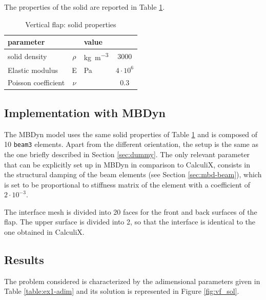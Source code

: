 The properties of the solid are reported in Table \ref{table:ex1-solid}.

\begin{table}[!htb]
	\begin{center}
		\begin{tabular}{ l c  l | c } 
			parameter & & value &    \\ 
			\hline
			solid density  & $\rho$ & \si{kg.m^{-3}} & 3000    \\
			Elastic modulus  & E & \si{Pa} & $4\cdot 10^6$    \\
			Poisson coefficient & $\nu$ & & $0.3$  \\
		\end{tabular}
	\end{center}
	\caption{Vertical flap: solid properties}
	\label{table:ex1-solid}
\end{table}

 
\subsection{Implementation with MBDyn}


The MBDyn model uses the same solid properties of Table \ref{table:ex1-solid} and is composed of 10 \texttt{beam3} elements. Apart from the different orientation, the setup is the same as the one briefly described in Section \ref{sec:dummy}. The only relevant parameter that can be explicitly set up in MBDyn in comparison to CalculiX, consists in the structural damping of the beam elements (see Section \ref{sec:mbd-beam}), which is set to be proportional to stiffness matrix of the element with a coefficient of $2\cdot10^{-3}$.

The interface mesh is divided into 20 faces for the front and back surfaces of the flap. The upper surface is divided into 2, so that the interface is identical to the one obtained in CalculiX. 



\subsection{Results}

The problem considered is characterized by the adimensional parameters given in Table \ref{table:ex1-adim} and its solution is represented in Figure \ref{fig:vf_sol}.


